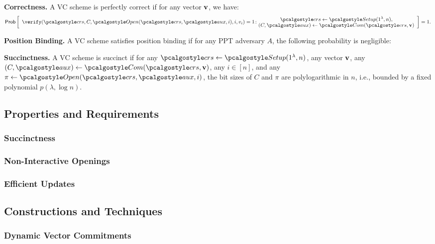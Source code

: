 \documentclass{iacrcc}
\begin{document}
\textbf{Correctness.} A VC scheme is perfectly correct if for any vector $\mathbf{v}$, we have:
\[
\Pr \left[
\begin{array}{c}
    \substack{\displaystyle
        \verify(\crs, C, \open(\crs, \aux, i), i, v_i) = 1 \colon\\
        }
    \substack{\displaystyle
        \crs \leftarrow \setup(1^\lambda, n), \\
        \displaystyle
        (C, \aux) \leftarrow \commit(\crs, \vvec)
    }
\end{array}
\right] = 1.
\]

\textbf{Position Binding.} A VC scheme satisfies position binding if for any PPT adversary $A$, the following probability is negligible:

\textbf{Succinctness.} A VC scheme is succinct if for any $\crs \leftarrow \setup(1^\lambda, n)$, any vector $\mathbf{v}$, any $(C, \aux) \leftarrow \commit(\crs, \vvec)$, any $i \in [n]$, and any $\pi \leftarrow \open(\crs, \aux, i)$, the bit sizes of $C$ and $\pi$ are polylogarithmic in $n$, i.e., bounded by a fixed polynomial $p(\lambda, \log n)$.


\subsection{Properties and Requirements}
\subsubsection{Succinctness}
\subsubsection{Non-Interactive Openings}
\subsubsection{Efficient Updates}

\subsection{Constructions and Techniques}

\cite{TCC:CFGG22,EC:WeeWu23,AC:CNRZZ22,AC:CFGKN20,CCS:GRWZ20,ACISP:LSYPYL21,C:LaiMal19,SCN:TABDFK20,TCC:PeiPepSha21,EPRINT:WanUliPap22,EPRINT:WeeWu22,EPRINT:SCPTZ21}

\subsubsection{Dynamic Vector Commitments}
\end{document}
